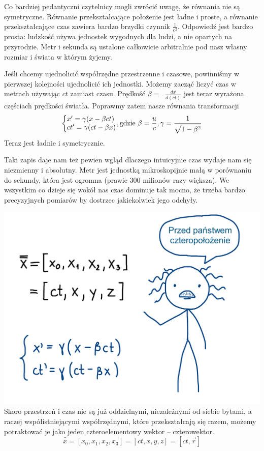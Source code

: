 \documentclass[10pt,twocolumn,fleqn,polish]{article}
\makeatletter
\newcommand{\derivative}[2][]{\mathop{}\!\frac{{d}#1}{{d}#2}}
\newcommand{\fourvec}[1]{\bar{\bar{#1}}}
\newenvironment{eqsystem}
  {\left\lbrace
    \begin{array}{@{}l@{}}}
  {\end{array}\right.}
\makeatother
\begin{document}
Co bardziej pedantyczni czytelnicy mogli zwrócić uwagę, że równania nie są symetryczne.
Równanie przekształcające położenie jest ładne i proste, a równanie przekształcające
czas zawiera bardzo brzydki czynnik $\frac{1}{c^2}$.
Odpowiedź jest bardzo prosta: ludzkość używa jednostek wygodnych dla ludzi, a nie
opartych na przyrodzie. Metr i sekunda są ustalone całkowicie arbitralnie pod
nasz własny rozmiar i świata w którym żyjemy.

Jeśli chcemy ujednolicić współrzędne przestrzenne i czasowe, powinniśmy w pierwszej
kolejności ujednolicić ich jednostki. Możemy zacząć liczyć czas w metrach używając $ct$
zamiast czasu. Prędkość $\beta = \derivative[x]{(ct)}$ jest teraz wyrażona częściach
prędkości światła. Poprawmy zatem nasze równania transformacji
\[
  \begin{eqsystem}
    x' = \gamma (x - \beta ct) \\
    ct' = \gamma (ct - \beta x)
  \end{eqsystem}, \text{gdzie}\ \beta = \frac{u}{c}, \gamma = \frac{1}{\sqrt{1-\beta^2}}
\]
Teraz jest ładnie i symetrycznie.

Taki zapis daje nam też pewien wgląd dlaczego intuicyjnie czas wydaje nam się
niezmienny i absolutny. Metr jest jednostką mikroskopijnie małą w porównaniu do
sekundy, która jest ogromna (prawie 300 milionów razy większa). We wszystkim co
dzieje się wokół nas czas dominuje tak mocno, że trzeba bardzo precyzyjnych pomiarów
by dostrzec jakiekolwiek jego odchyły.
\newpage

\noindent\includegraphics[width=1\linewidth]{pages/STA-page23}
Skoro przestrzeń i czas nie są już oddzielnymi, niezależnymi od siebie bytami,
a raczej współistniejącymi współrzędnymi, które przekształcają się razem,
możemy potraktować je jako jeden czteroelementowy wektor -- czterowektor\footnotemark.
\[
  \fourvec{x} = [x_0, x_1, x_2, x_3] = [ct, x, y, z] = [ct, \vec{r}]
\]
\end{document}
